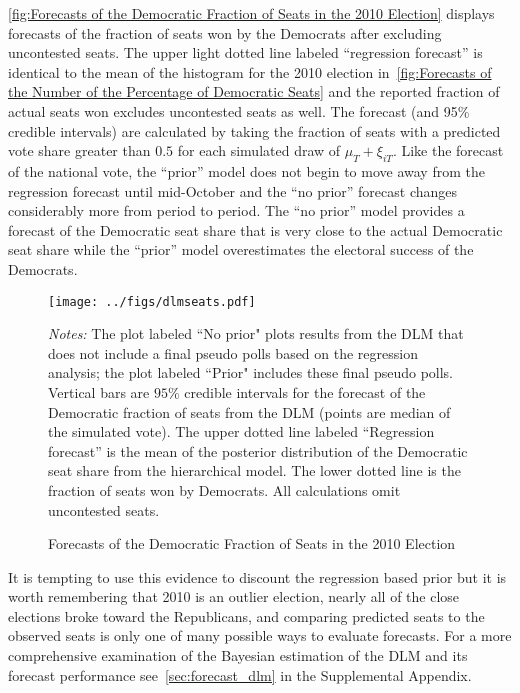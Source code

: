 \documentclass[12pt,final,fleqn]{article}
\theoremstyle{plain}
\begin{document}
\autoref{fig:Forecasts of the Democratic Fraction of Seats in the 2010 Election} displays forecasts of the fraction of seats won by the Democrats after excluding uncontested seats. The upper light dotted line labeled ``regression forecast'' is identical to the mean of the histogram for the 2010 election in~\autoref{fig:Forecasts of the Number of the Percentage of Democratic Seats} and the reported fraction of actual seats won excludes uncontested seats as well. The forecast (and 95\% credible intervals) are calculated by taking the fraction of seats with a predicted vote share greater than $0.5$ for each simulated draw of $\mu_T + \xi_{iT}$. Like the forecast of the national vote, the ``prior'' model does not begin to move away from the regression forecast until mid-October and the ``no prior'' forecast changes considerably more from period to period. The ``no prior'' model provides a forecast of the Democratic seat share that is very close to the actual Democratic seat share while the ``prior'' model overestimates the electoral success of the Democrats. 

\begin{figure}[!htb]
\centering
\texttt{[image: ../figs/dlmseats.pdf]}
\vspace{.5cm}
\caption{Forecasts of the Democratic Fraction of Seats in the 2010 Election}
\label{fig:Forecasts of the Democratic Fraction of Seats in the 2010 Election}
\begin{minipage}{\linewidth}
\footnotesize
\emph{Notes:} The plot labeled ``No prior" plots results from the DLM that does not include a final pseudo polls based on the regression analysis; the plot labeled ``Prior" includes these final pseudo polls. Vertical bars are $95\%$ credible intervals for the forecast of the Democratic fraction of seats from the DLM (points are median of the simulated vote). The upper dotted line labeled ``Regression forecast'' is the mean of the posterior distribution of the Democratic seat share from the hierarchical model. The lower dotted line is the fraction of seats won by Democrats. All calculations omit uncontested seats.
\end{minipage}
\end{figure}

It is tempting to use this evidence to discount the regression based prior but it is worth remembering that 2010 is an outlier election, nearly all of the close elections broke toward the Republicans, and comparing predicted seats to the observed seats is only one of many possible ways to evaluate forecasts. For a more comprehensive  examination of the Bayesian estimation of the DLM and its forecast performance see~\autoref*{sec:forecast_dlm} in the Supplemental Appendix. 
\end{document}
